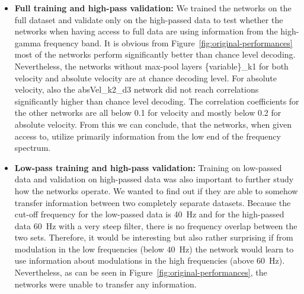\begin{itemize}
    \item \textbf{Full training and high-pass validation:} We trained the networks on the full dataset and validate only on the high-passed data to test whether the networks when having access to full data are using information from the high-gamma frequency band.
    It is obvious from Figure~\ref{fig:original-performances} most of the networks perform significantly better than chance level decoding.
    Nevertheless, the networks without max-pool layers \{variable\}\_k1 for both velocity and absolute velocity are at chance decoding level. For absolute velocity, also the absVel\_k2\_d3 network did not reach correlations significantly higher than chance level decoding. 
    The correlation coefficients for the other networks are all below 0.1 for velocity and mostly below 0.2 for absolute velocity.
    From this we can conclude, that the networks, when given access to, utilize primarily information from the low end of the frequency spectrum.
    \item \textbf{Low-pass training and high-pass validation:}
    Training on low-passed data and validation on high-passed data was also important to further study how the networks operate.
    We wanted to find out if they are able to somehow transfer information between two completely separate datasets.
    Because the cut-off frequency for the low-passed data is 40~Hz and for the high-passed data 60~Hz with a very steep filter, there is no frequency overlap between the two sets.
    Therefore, it would be interesting but also rather surprising if from modulation in the low frequencies (below 40~Hz) the network would learn to use information about modulations in the high frequencies (above 60~Hz).
    Nevertheless, as can be seen in Figure~\ref{fig:original-performances}, the networks were unable to transfer any information.
    

\end{itemize}
